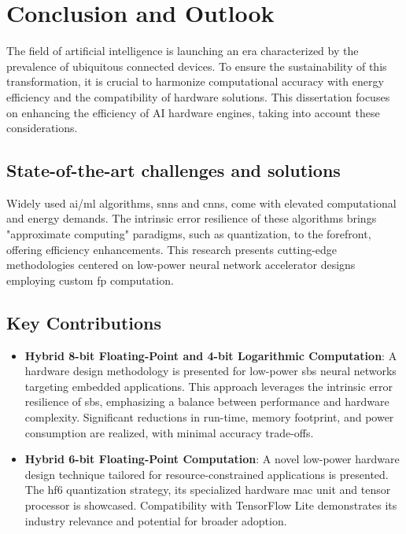 \chapter{Conclusion and Outlook}
\label{chap.conclusion}
\minitoc
The field of artificial intelligence is launching an era characterized by the prevalence of ubiquitous connected devices. To ensure the sustainability of this transformation, it is crucial to harmonize computational accuracy with energy efficiency and the compatibility of hardware solutions. This dissertation focuses on enhancing the efficiency of AI hardware engines, taking into account these considerations.

\section{State-of-the-art challenges and solutions}
Widely used \gls{ai}/\gls{ml} algorithms, \glspl{snn} and \glspl{cnn}, come with elevated computational and energy demands. The intrinsic error resilience of these algorithms brings "approximate computing" paradigms, such as quantization, to the forefront, offering efficiency enhancements. This research presents cutting-edge methodologies centered on low-power neural network accelerator designs employing custom \gls{fp} computation.

\section{Key Contributions}
\begin{itemize}
	\item \textbf{Hybrid 8-bit Floating-Point and 4-bit Logarithmic Computation}: A hardware design methodology is presented for low-power \gls{sbs} neural networks targeting embedded applications. This approach leverages the intrinsic error resilience of \gls{sbs}, emphasizing a balance between performance and hardware complexity. Significant reductions in run-time, memory footprint, and power consumption are realized, with minimal accuracy trade-offs.
	
	\item \textbf{Hybrid 6-bit Floating-Point Computation}: A novel low-power hardware design technique tailored for resource-constrained applications is presented. The \gls{hf6} quantization strategy, its specialized hardware \gls{mac} unit and tensor processor is showcased. Compatibility with TensorFlow Lite demonstrates its industry relevance and potential for broader adoption.
\end{itemize}


